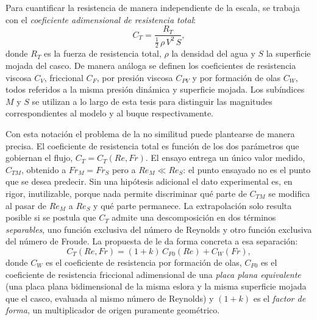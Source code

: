 Para cuantificar la resistencia de manera independiente de la escala, se trabaja con el \emph{coeficiente adimensional de resistencia total}:
%
\begin{equation}\label{eq:CT}
    C_T = \frac{R_T}{\tfrac{1}{2}\,\rho\,V^2\,S},
\end{equation}
%
donde $R_T$ es la fuerza de resistencia total, $\rho$ la densidad del agua
y $S$ la superficie mojada del casco. De manera
análoga se definen los coeficientes de resistencia viscosa $C_V$, friccional
$C_F$, por presión viscosa $C_{PV}$ y por formación de olas $C_W$, todos
referidos a la misma presión dinámica y superficie mojada. Los subíndices
$M$ y $S$ se utilizan a lo largo de esta tesis para distinguir las
magnitudes correspondientes al modelo y al buque respectivamente.

Con esta notación el problema de la no similitud puede plantearse de manera
precisa. El coeficiente de resistencia total es función de los dos parámetros
que gobiernan el flujo, $C_T = C_T(Re, Fr)$. El ensayo entrega un único valor
medido, $C_{TM}$, obtenido a $Fr_M = Fr_S$ pero a $Re_M \ll Re_S$: el punto
ensayado no es el punto que se desea predecir. Sin una hipótesis adicional el
dato experimental es, en rigor, inutilizable, porque nada permite discriminar
qué parte de $C_{TM}$ se modifica al pasar de $Re_M$ a $Re_S$ y qué parte
permanece. La extrapolación solo resulta posible si se postula que $C_T$ admite
una descomposición en dos términos \emph{separables}, uno función exclusiva del
número de Reynolds y otro función exclusiva del número de Froude. La propuesta de
\citet{hughes1954} le da forma concreta a esa separación:
%
\begin{equation}\label{eq:CT_decomposicion_hughes}
    C_T(Re,Fr) = (1+k)\,C_{F0}(Re) + C_W(Fr),
\end{equation}
%
donde $C_W$ es el coeficiente de resistencia por formación de olas, $C_{F0}$ es
el coeficiente de resistencia friccional adimensional de una \emph{placa plana
equivalente} (una placa plana bidimensional de la misma eslora y la misma
superficie mojada que el casco, evaluada al mismo número de Reynolds)
y $(1+k)$
es el \emph{factor de forma}, un multiplicador de origen puramente geométrico.

